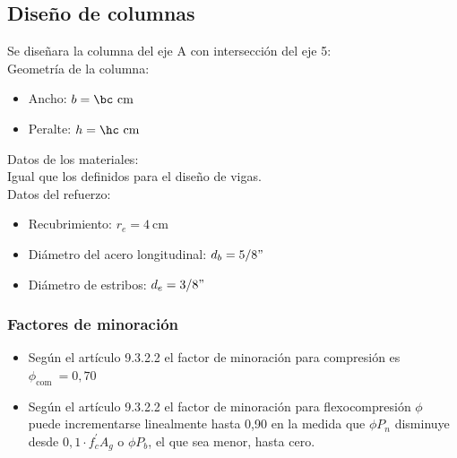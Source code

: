 \FPset{}
\FPset{}
\FPset{}
\subsection{Diseño de columnas}
\noindent Se diseñara la columna del eje A con intersección del eje 5:\\
\noindent Geometría de la columna:
\begin{itemize}
  \item Ancho: $b=\bc \mathrm{~cm}$
  \item Peralte: $h=\hc \mathrm{~cm}$
\end{itemize}
\noindent
Datos de los materiales:\\
\noindent Igual que los definidos para el diseño de vigas.\\
Datos del refuerzo:
\begin{itemize}
  \item Recubrimiento: $r_{e}=4 \mathrm{~cm}$
  \item Diámetro del acero longitudinal: $d_{b}=5/8"$
  \item Diámetro de estribos: $d_{e}=3/8"$
\end{itemize}
\subsubsection{Factores de minoración}
\begin{itemize}
  \item Según el artículo 9.3.2.2 el factor de minoración para compresión es $\phi_{\text {com }}=0,70$

  \item Según el artículo 9.3.2.2 el factor de minoración para flexocompresión $\phi$ puede incrementarse linealmente hasta 0,90 en la medida que $\phi P_{n}$ disminuye desde $0,1 \cdot f_{c}^{\prime} A_{g}$ o $\phi P_{b}$, el que sea menor, hasta cero.
\end{itemize}

